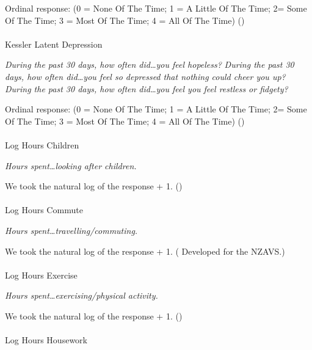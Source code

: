 \documentclass[
  single column]{article}
\makeatletter
\let\oldparagraph\paragraph
\renewcommand{\paragraph}{
    \@ifstar
      \xxxParagraphStar
      \xxxParagraphNoStar
  }
\newcommand{\xxxParagraphStar}[1]{\oldparagraph*{#1}\mbox{}}
\newcommand{\xxxParagraphNoStar}[1]{\oldparagraph{#1}\mbox{}}
\makeatother
\begin{document}
Ordinal response: (0 = None Of The Time; 1 = A Little Of The Time; 2=
Some Of The Time; 3 = Most Of The Time; 4 = All Of The Time)
()

\paragraph{Kessler Latent Depression}\label{kessler-latent-depression}

\emph{During the past 30 days, how often did\ldots you feel hopeless?}
\emph{During the past 30 days, how often did\ldots you feel so depressed
that nothing could cheer you up?} \emph{During the past 30 days, how
often did\ldots you feel you feel restless or fidgety?}

Ordinal response: (0 = None Of The Time; 1 = A Little Of The Time; 2=
Some Of The Time; 3 = Most Of The Time; 4 = All Of The Time)
()

\paragraph{Log Hours Children}\label{log-hours-children}

\emph{Hours spent\ldots looking after children.}

We took the natural log of the response + 1.
()

\paragraph{Log Hours Commute}\label{log-hours-commute}

\emph{Hours spent\ldots travelling/commuting.}

We took the natural log of the response + 1.
( Developed for the
NZAVS.)

\paragraph{Log Hours Exercise}\label{log-hours-exercise}

\emph{Hours spent\ldots exercising/physical activity.}

We took the natural log of the response + 1.
()

\paragraph{Log Hours Housework}\label{log-hours-housework}
\end{document}
